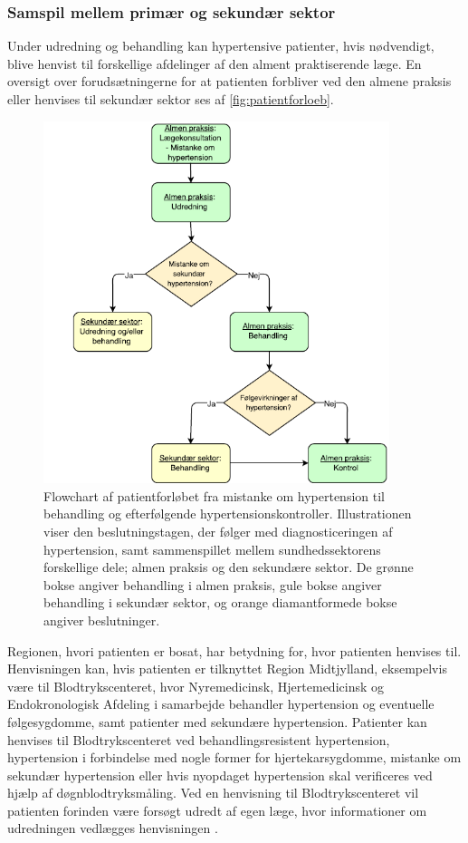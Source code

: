 \subsubsection{Samspil mellem primær og sekundær sektor}
Under udredning og behandling kan hypertensive patienter, hvis nødvendigt, blive henvist til forskellige afdelinger af den alment praktiserende læge. En oversigt over forudsætningerne for at patienten forbliver ved den almene praksis eller henvises til sekundær sektor ses af \autoref{fig:patientforloeb}. 

\begin{figure}[H]
\centering
\includegraphics[width=0.9\textwidth]{figures/patientforloeb3}
\caption{Flowchart af patientforløbet fra mistanke om hypertension til behandling og efterfølgende hypertensionskontroller. Illustrationen viser den beslutningstagen, der følger med diagnosticeringen af hypertension, samt sammenspillet mellem sundhedssektorens forskellige dele; almen praksis og den sekundære sektor. De grønne bokse angiver behandling i almen praksis, gule bokse angiver behandling i sekundær sektor, og orange diamantformede bokse angiver beslutninger.}
\label{fig:patientforloeb}
\end{figure}

\noindent
Regionen, hvori patienten er bosat, har betydning for, hvor patienten henvises til. Henvisningen kan, hvis patienten er tilknyttet Region Midtjylland, eksempelvis være til Blodtrykscenteret, hvor Nyremedicinsk, Hjertemedicinsk og Endokronologisk Afdeling i samarbejde behandler hypertension og eventuelle følgesygdomme, samt patienter med sekundære hypertension. Patienter kan henvises til Blodtrykscenteret ved behandlingsresistent hypertension, hypertension i forbindelse med nogle former for hjertekarsygdomme, mistanke om sekundær hypertension eller hvis nyopdaget hypertension skal verificeres ved hjælp af døgnblodtryksmåling. Ved en henvisning til Blodtrykscenteret vil patienten forinden være forsøgt udredt af egen læge, hvor informationer om udredningen vedlægges henvisningen \citep{aarhusuniversitetshospital}. 

